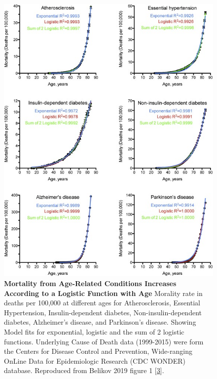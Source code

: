 \documentclass[
]{book}
\begin{document}
\begin{figure}

{\centering \includegraphics[width=0.8\linewidth]{figs/Belikov2019_fig1} 

}

\caption{\textbf{Mortality from Age-Related Conditions Increases According to a Logistic Function with Age} Morality rate in deaths per 100,000 at different ages for Atherosclerosis, Essential Hypertension, Insulin-dependent diabetes, Non-insulin-dependent diabetes, Alzheimer's disease, and Parkinson's disease. Showing Model fits for exponential, logistic and the sum of 2 logistic functions. Underlying Cause of Death data (1999-2015) were form the Centers for Disease Control and Prevention, Wide-ranging OnLine Data for Epidemiologic Research (CDC WONDER) database. Reproduced from Belikov 2019 figure 1 {[}\protect\hyperlink{ref-Belikov2019}{3}{]}.}\label{fig:Belikov2019-fig1}
\end{figure}
\end{document}
